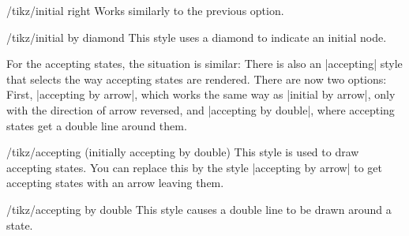 \begin{stylekey}{/tikz/initial right}
    Works similarly to the previous option.
\end{stylekey}

\begin{stylekey}{/tikz/initial by diamond}
    This style uses a diamond to indicate an initial node.
\end{stylekey}

For the accepting states, the situation is similar: There is also an
|accepting| style that selects the way accepting states are rendered. There are
now two options: First, |accepting by arrow|, which works the same way as
|initial by arrow|, only with the direction of arrow reversed, and
|accepting by double|, where accepting states get a double line around them.

\begin{stylekey}{/tikz/accepting (initially accepting by double)}
    This style is used to draw accepting states.  You can replace this by the
    style |accepting by arrow| to get accepting states with an arrow leaving
    them.
\end{stylekey}

\begin{stylekey}{/tikz/accepting by double}
    This style causes a double line to be drawn around a state.
\end{stylekey}

